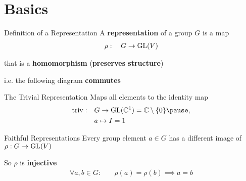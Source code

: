 
\section{Basics}

\begin{frame}{Definition of a Representation}
    \large
    A \textbf{representation} of a group $G$ is a map
    \Large
    \begin{align*}
        \rho: \quad G \to \operatorname{GL}(V)
    \end{align*}
    
    \normalsize
    \pause
    that is a \textbf{homomorphism} (\textbf{preserves structure})

    \pause
    i.e. the following diagram \textbf{commutes}
    \begin{figure}
        \centering
    \end{figure}
    {\hspace*{\fill} \cite{hein2013}}

\end{frame}

\begin{frame}{The Trivial Representation}
    \large
    Maps all elements to the identity map
    \Large
        \pause
    \begin{align*}
        \triv: \quad & G \to \GL(\C^1) = \C \setminus \{0\} \pause , \\
        & a \mapsto I = 1
    \end{align*}
    
    \normalsize
    {\hspace*{\fill} \cite{hein2013}}
\end{frame}

\begin{frame}{Faithful Representations}
    \large
    Every group element $a \in G$ has a different image of $\rho: G \to \operatorname{GL}(V)$

    \pause
    So $\rho$ is \textbf{injective}
    \Large
    \begin{align*}
        \forall a, b \in G: \quad & \rho(a) = \rho(b) \implies a = b
    \end{align*}
    \normalsize
    {\hspace*{\fill} \cite{hein2013}}
\end{frame}

